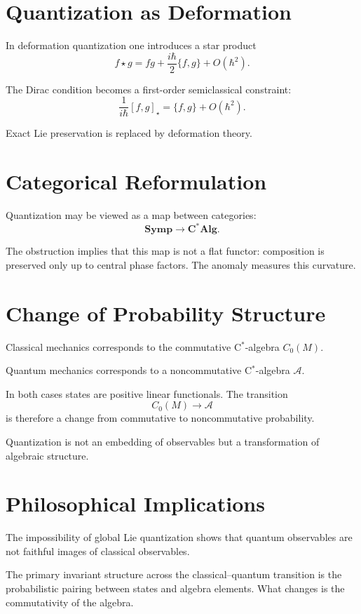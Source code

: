 \documentclass[11pt]{article}
\theoremstyle{definition}
\theoremstyle{remark}
\begin{document}
\section{Quantization as Deformation}

In deformation quantization one introduces a star product
\[
f \star g = fg + \frac{i\hbar}{2}\{f,g\} + O(\hbar^2).
\]

The Dirac condition becomes a first-order semiclassical constraint:
\[
\frac{1}{i\hbar}[f,g]_\star = \{f,g\} + O(\hbar^2).
\]

Exact Lie preservation is replaced by deformation theory.

\section{Categorical Reformulation}

Quantization may be viewed as a map between categories:
\[
\mathbf{Symp} \longrightarrow \mathbf{C^*Alg}.
\]

The obstruction implies that this map is not a flat functor: composition is preserved only up to central phase factors. The anomaly measures this curvature.

\section{Change of Probability Structure}

Classical mechanics corresponds to the commutative C$^*$-algebra $C_0(M)$.

Quantum mechanics corresponds to a noncommutative C$^*$-algebra $\mathcal{A}$.

In both cases states are positive linear functionals. The transition
\[
C_0(M) \longrightarrow \mathcal{A}
\]
is therefore a change from commutative to noncommutative probability.

Quantization is not an embedding of observables but a transformation of algebraic structure.

\section{Philosophical Implications}

The impossibility of global Lie quantization shows that quantum observables are not faithful images of classical observables.

The primary invariant structure across the classical--quantum transition is the probabilistic pairing between states and algebra elements. What changes is the commutativity of the algebra.
\end{document}
